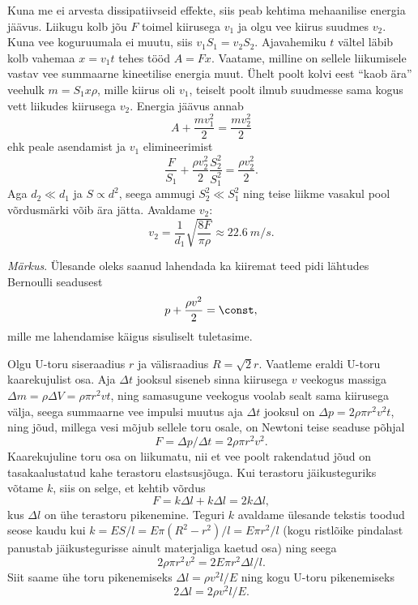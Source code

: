 \documentclass[10pt, twoside]{article}
\begin{document}
{
\solu
Kuna me ei arvesta dissipatiivseid effekte, siis peab kehtima mehaanilise energia jäävus. Liikugu kolb jõu $F$ toimel kiirusega $v_1$ ja olgu vee kiirus suudmes $v_2$. Kuna vee koguruumala ei muutu, siis $v_1S_1 = v_2S_2$. Ajavahemiku $t$ vältel
läbib kolb vahemaa $x = v_1t$ tehes tööd $A = F x$. Vaatame, milline on sellele liikumisele vastav vee summaarne kineetilise energia muut. Ühelt poolt kolvi eest \enquote{kaob ära} veehulk $m = S_1x\rho$, mille kiirus oli $v_1$, teiselt poolt ilmub suudmesse sama kogus vett liikudes kiirusega $v_2$. Energia jäävus annab
\[
A+\frac{m v_{1}^{2}}{2}=\frac{m v_{2}^{2}}{2}
\]
ehk peale asendamist ja $v_1$ elimineerimist
\[
\frac{F}{S_{1}}+\frac{\rho v_{2}^{2}}{2} \frac{S_{2}^{2}}{S_{1}^{2}}=\frac{\rho v_{2}^{2}}{2}.
\]
Aga $d_2 \ll d_1$ ja $S \propto d^2$, seega ammugi $S_2^2 \ll S_1^2$ ning teise liikme vasakul pool võrdusmärki võib ära jätta. Avaldame $v_2$:
\[
v_{2}=\frac{1}{d_{1}} \sqrt{\frac{8 F}{\pi \rho}} \approx \SI{22,6}{m/s}.
\]

\emph{Märkus}. Ülesande oleks saanud lahendada ka kiiremat teed pidi lähtudes Bernoulli seadusest
\[
p+\frac{\rho v^{2}}{2}=\const,
\]
mille me lahendamise käigus sisuliselt tuletasime.
\probend
\bigskip


\solu
Olgu U-toru siseraadius $r$ ja välisraadius $R = \sqrt 2 r$. Vaatleme eraldi U-toru kaarekujulist osa. Aja $\Delta t$ jooksul siseneb sinna kiirusega $v$ veekogus massiga $\Delta m = \rho \Delta V = \rho \pi r^2vt$, ning samasugune veekogus voolab sealt sama kiirusega välja, seega summaarne vee impulsi muutus aja $\Delta t$ jooksul on $\Delta p= 2\rho\pi r^2v^2 t$, ning jõud, millega vesi mõjub sellele toru osale, on Newtoni teise seaduse põhjal
\[
F=\Delta p/\Delta t= 2\rho\pi r^2v^2. 
\]
Kaarekujuline toru osa on liikumatu, nii et vee poolt rakendatud jõud on tasakaalustatud kahe terastoru elastsusjõuga. Kui terastoru jäikusteguriks võtame $k$, siis on selge, et kehtib võrdus
\[
F = k\Delta l+k\Delta l = 2k\Delta l,
\] 
kus $\Delta l$ on ühe terastoru pikenemine. Teguri $k$ avaldame ülesande tekstis toodud seose kaudu kui $k = ES/l = E\pi \left(R^2 - r^2\right)/l = E\pi r^2/l$ (kogu ristlõike pindalast panustab jäikustegurisse ainult materjaliga kaetud osa) ning seega 
\[
2\rho\pi r^2 v^2= 2E\pi r^2\Delta l/l.
\]
Siit saame ühe toru pikenemiseks $\Delta l=\rho v^2 l/E$ ning kogu U-toru pikenemiseks 
\[
2\Delta l= 2\rho v^2 l/E.
\]
\probend
\bigskip

}
\end{document}
